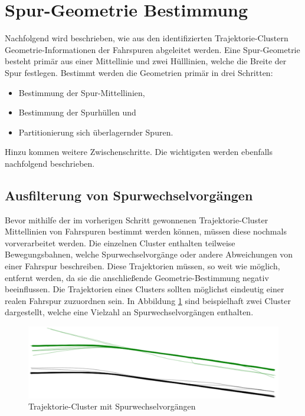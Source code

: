 
\section{Spur-Geometrie Bestimmung}
\label{cha:lane_definition}

Nachfolgend wird beschrieben, wie aus den identifizierten Trajektorie-Clustern
Geometrie-Informationen der Fahrspuren abgeleitet werden. Eine Spur-Geometrie besteht primär
aus einer Mittellinie und zwei Hülllinien, welche die Breite der Spur festlegen.
Bestimmt werden die Geometrien primär in drei Schritten:

\begin{itemize}
    \item Bestimmung der Spur-Mittellinien,
    \item Bestimmung der Spurhüllen und
    \item Partitionierung sich überlagernder Spuren.
\end{itemize}

Hinzu kommen weitere Zwischenschritte. Die wichtigsten werden ebenfalls nachfolgend beschrieben.

\subsection{Ausfilterung von Spurwechselvorgängen}
\label{sec:real2_filter_lane_change}

Bevor mithilfe der im vorherigen Schritt gewonnenen Trajektorie-Cluster Mittellinien von Fahrspuren bestimmt
werden können, müssen diese nochmals vorverarbeitet werden. Die einzelnen Cluster enthalten teilweise
Bewegungsbahnen, welche Spurwechselvorgänge oder andere Abweichungen von einer Fahrspur beschreiben.
Diese Trajektorien müssen, so weit wie möglich,
entfernt werden, da sie die anschließende Geometrie-Bestimmung negativ beeinflussen. Die Trajektorien
eines Clusters sollten möglichst eindeutig einer realen Fahrspur zuzuordnen sein. In Abbildung
\ref{fig:real2_clusters_pre_postpro} sind beispielhaft zwei Cluster dargestellt, welche eine Vielzahl an
Spurwechselvorgängen enthalten.

\begin{figure}[H]
    \centering
    \includegraphics[width=0.8\linewidth]{resources/img/umsetzung/U2/Clusters_Pre_Postprocessing}
    \caption{Trajektorie-Cluster mit Spurwechselvorgängen}
    \label{fig:real2_clusters_pre_postpro}
\end{figure}


